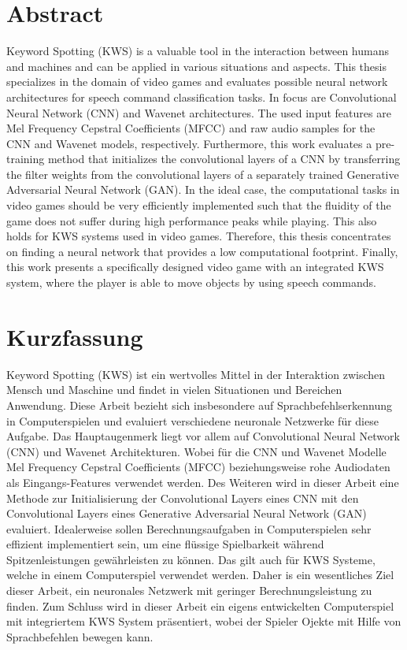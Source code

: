 
\chapter*{Abstract}\label{sec:shards_abstract}
Keyword Spotting (KWS) is a valuable tool in the interaction between humans and machines and can be applied in various situations and aspects.
This thesis specializes in the domain of video games and evaluates possible neural network architectures for speech command classification tasks.
In focus are Convolutional Neural Network (CNN) and Wavenet architectures.
The used input features are Mel Frequency Cepstral Coefficients (MFCC) and raw audio samples for the CNN and Wavenet models, respectively.
Furthermore, this work evaluates a pre-training method that initializes the convolutional layers of a CNN by transferring the filter weights from the convolutional layers of a separately trained Generative Adversarial Neural Network (GAN).
In the ideal case, the computational tasks in video games should be very efficiently implemented such that the fluidity of the game does not suffer during high performance peaks while playing.
This also holds for KWS systems used in video games.
Therefore, this thesis concentrates on finding a neural network that provides a low computational footprint.
Finally, this work presents a specifically designed video game with an integrated KWS system, where the player is able to move objects by using speech commands.



\chapter*{Kurzfassung}
Keyword Spotting (KWS) ist ein wertvolles Mittel in der Interaktion zwischen Mensch und Maschine und findet in vielen Situationen und Bereichen Anwendung.
Diese Arbeit bezieht sich insbesondere auf Sprachbefehlserkennung in Computerspielen und evaluiert verschiedene neuronale Netzwerke für diese Aufgabe.
Das Hauptaugenmerk liegt vor allem auf Convolutional Neural Network (CNN) und Wavenet Architekturen.
Wobei für die CNN und Wavenet Modelle Mel Frequency Cepstral Coefficients (MFCC) beziehungsweise rohe Audiodaten als Eingangs-Features verwendet werden.
Des Weiteren wird in dieser Arbeit eine Methode zur Initialisierung der Convolutional Layers eines CNN mit den Convolutional Layers eines Generative Adversarial Neural Network (GAN) evaluiert.
Idealerweise sollen Berechnungsaufgaben in Computerspielen sehr effizient implementiert sein, um eine flüssige Spielbarkeit während Spitzenleistungen gewährleisten zu können.
Das gilt auch für KWS Systeme, welche in einem Computerspiel verwendet werden.
Daher is ein wesentliches Ziel dieser Arbeit, ein neuronales Netzwerk mit geringer Berechnungsleistung zu finden.
Zum Schluss wird in dieser Arbeit ein eigens entwickelten Computerspiel mit integriertem KWS System präsentiert, wobei der Spieler Ojekte mit Hilfe von Sprachbefehlen bewegen kann.